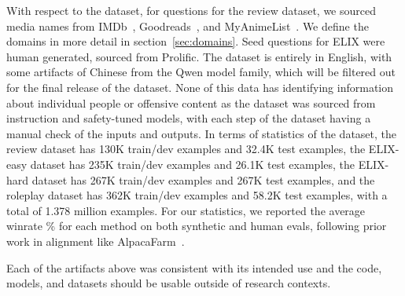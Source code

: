 With respect to the dataset, for questions for the review dataset, we sourced media names from IMDb~\citep{imdb}, Goodreads~\citep{goodreads}, and MyAnimeList~\citep{myanimelist}. We define the domains in more detail in section~\ref{sec:domains}. Seed questions for ELIX were human generated, sourced from Prolific. The dataset is entirely in English, with some artifacts of Chinese from the Qwen model family, which will be filtered out for the final release of the dataset. None of this data has identifying information about individual people or offensive content as the dataset was sourced from instruction and safety-tuned models, with each step of the dataset having a manual check of the inputs and outputs. In terms of statistics of the dataset, the review dataset has 130K train/dev examples and 32.4K test examples, the ELIX-easy dataset has 235K train/dev examples and 26.1K test examples, the ELIX-hard dataset has 267K train/dev examples and 267K test examples, and the roleplay dataset has 362K train/dev examples and 58.2K test examples, with a total of 1.378 million examples. For our statistics, we reported the average winrate \% for each method on both synthetic and human evals, following prior work in alignment like AlpacaFarm~\citep{dubois2024alpacafarm}. 

Each of the artifacts above was consistent with its intended use and the code, models, and datasets should be usable outside of research contexts.

